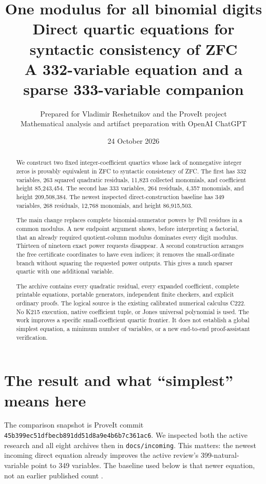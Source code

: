 \documentclass[11pt,letterpaper]{article}
\title{\color{navy}One modulus for all binomial digits\\[5pt]
\large Direct quartic equations for syntactic consistency of ZFC\\
\normalsize A 332-variable equation and a sparse 333-variable companion}
\author{Prepared for Vladimir Reshetnikov and the ProveIt project\\
\small Mathematical analysis and artifact preparation with OpenAI ChatGPT}
\date{24 October 2026}
\theoremstyle{remark}\newtheorem{remark}[theorem]{Remark}
\newcommand{\sha}{\texttt{45b399ec51dfbecb891dd51d8a9e4b6b7c361ac6}}
\begin{document}
\maketitle
\begin{abstract}
We construct two fixed integer-coefficient quartics whose lack of
nonnegative integer zeros is provably equivalent in ZFC to syntactic
consistency of ZFC. The first has 332 variables, 263 squared quadratic
residuals, 11,823 collected monomials, and coefficient height 85,243,454.
The second has 333 variables, 264 residuals, 4,357 monomials, and height
209,508,384. The newest inspected direct-construction baseline has 349
variables, 268 residuals, 12,768 monomials, and height 86,915,503.

The main change replaces complete binomial-numerator powers by Pell
residues in a common modulus. A new endpoint argument shows, before
interpreting a factorial, that an already required quotient-column
modulus dominates every digit modulus. Thirteen of nineteen exact power
requests disappear. A second construction arranges the free certificate
coordinates to have even indices; it removes the small-ordinate branch
without squaring the requested power outputs. This gives a much sparser
quartic with one additional variable.

The archive contains every quadratic residual, every expanded coefficient,
complete printable equations, portable generators, independent finite
checkers, and explicit ordinary proofs. The logical source is the existing
calibrated numerical calculus C222. No K215 execution, native coefficient
tuple, or Jones universal polynomial is used. The work improves a specific
small-coefficient quartic frontier. It does not establish a global simplest
equation, a minimum number of variables, or a new end-to-end proof-assistant
verification.
\end{abstract}
\newpage
\tableofcontents
\newpage

\section{The result and what ``simplest'' means here}

The comparison snapshot is ProveIt commit \sha. We inspected both the
active research and all eight archives then in \texttt{docs/incoming}.
This matters: the newest incoming direct equation already improves the
active review's 399-natural-variable point to 349 variables. The baseline
used below is that newer equation, not an earlier published count
\cite{repo,round14,active}.
\end{document}

